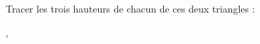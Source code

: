 
\begin{exercice}\label{exosmath-0928}

Tracer les trois hauteurs de chacun de ces deux triangles :
\begin{center}
   ,
   
\end{center}


\end{exercice}
